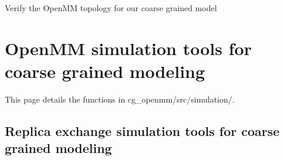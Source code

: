 \documentclass[letterpaper,12pt,english,openany,oneside]{sphinxmanual}
\begin{document}
\begin{fulllineitems}
\label{\detokenize{build:build.cg_build.verify_topology}}
Verify the OpenMM topology for our coarse grained model

\end{fulllineitems}


\begin{fulllineitems}
\label{\detokenize{build:build.cg_build.write_xml_file}}
\end{fulllineitems}



\chapter{OpenMM simulation tools for coarse grained modeling}
\label{\detokenize{simulation:openmm-simulation-tools-for-coarse-grained-modeling}}\label{\detokenize{simulation::doc}}
This page details the functions in cg\_openmm/src/simulation/.


\section{Replica exchange simulation tools for coarse grained modeling}
\label{\detokenize{simulation:module-simulation.rep_exch}}\label{\detokenize{simulation:replica-exchange-simulation-tools-for-coarse-grained-modeling}}
\end{document}
